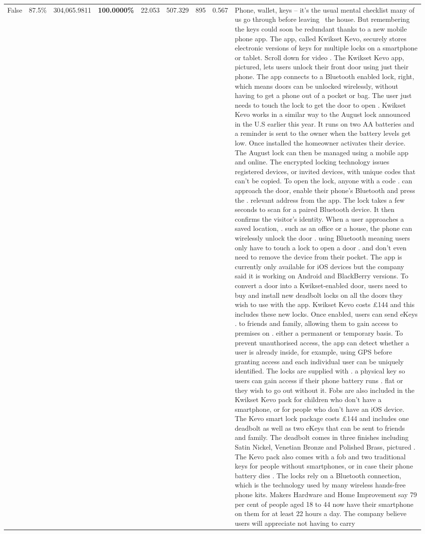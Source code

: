 \begin{table}[H]
\begin{tabular}{lllrlllll}
False & 87.5\% & \color{red} 304,065.9811 & \bfseries \color{red} 100.0000\% & 22.053 & 507.329 & 895 & 0.567 & Phone, wallet, keys – it’s the usual mental checklist many of us go through before leaving  the house. But remembering the keys could soon be redundant thanks to a new mobile phone app. The app, called Kwikset Kevo, securely stores electronic versions of keys for multiple locks on a smartphone or tablet. Scroll down for video . The Kwikset Kevo app, pictured, lets users unlock their front door using just their phone. The app connects to a Bluetooth enabled lock, right, which means doors can be unlocked wirelessly, without having to get a phone out of a pocket or bag. The user just needs to touch the lock to get the door to open . Kwikset Kevo works in a similar way to the August lock announced in the U.S earlier this year. It runs on two AA batteries and a reminder is sent to the owner when the battery levels get low. Once installed the homeowner activates their device. The August lock can then be managed using a mobile app and online. The encrypted locking technology issues registered devices, or invited devices, with unique codes that can't be copied. To open the lock, anyone with a code . can approach the door, enable their phone's Bluetooth and press the . relevant address from the app. The lock takes a few seconds to scan for a paired Bluetooth device. It then confirms the visitor's identity. When a user approaches a saved location, . such as an office or a house, the phone can wirelessly unlock the door . using Bluetooth meaning users only have to touch a lock to open a door . and don't even need to remove the device from their pocket. The app is currently only available for iOS devices but the company said it is working on Android and BlackBerry versions. To convert a door into a Kwikset-enabled door, users need to buy and install new deadbolt locks on all the doors they wish to use with the app. Kwikset Kevo costs £144 and this includes these new locks. Once enabled, users can send eKeys . to friends and family, allowing them to gain access to premises on . either a permanent or temporary basis. To prevent unauthorised access, the app can detect whether a user is already inside, for example, using GPS before granting access and each individual user can be uniquely identified. The locks are supplied with . a physical key so users can gain access if their phone battery runs . flat or they wish to go out without it. Fobs are also included in the Kwikset Kevo pack for children who don't have a smartphone, or for people who don't have an iOS device. The Kevo smart lock package costs £144 and includes one deadbolt as well as two eKeys that can be sent to friends and family. The deadbolt comes in three finishes including Satin Nickel, Venetian Bronze and Polished Brass, pictured . The Kevo pack also comes with a fob and two traditional keys for people without smartphones, or in case their phone battery dies . The locks rely on a Bluetooth connection, which is the technology used by many wireless hands-free phone kits. Makers Hardware and Home Improvement say 79 per cent of people aged 18 to 44 now have their smartphone on them for at least 22 hours a day. The company believe users will appreciate not having to carry 
\end{tabular}
\end{table}
